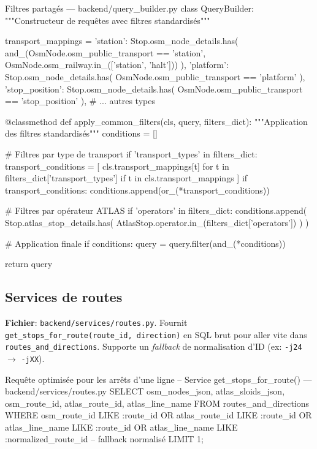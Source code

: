 \begin{codebox}[language=Python]{Filtres partagés — backend/query\_builder.py}
class QueryBuilder:
    """Constructeur de requêtes avec filtres standardisés"""
    
    transport_mappings = {
        'station': Stop.osm_node_details.has(
            and_(OsmNode.osm_public_transport == 'station',
                 OsmNode.osm_railway.in_(['station', 'halt']))
        ),
        'platform': Stop.osm_node_details.has(
            OsmNode.osm_public_transport == 'platform'
        ),
        'stop_position': Stop.osm_node_details.has(
            OsmNode.osm_public_transport == 'stop_position'
        ),
        # ... autres types
    }
    
    @classmethod
    def apply_common_filters(cls, query, filters_dict):
        """Application des filtres standardisés"""
        conditions = []
        
        # Filtres par type de transport
        if 'transport_types' in filters_dict:
            transport_conditions = [
                cls.transport_mappings[t] 
                for t in filters_dict['transport_types']
                if t in cls.transport_mappings
            ]
            if transport_conditions:
                conditions.append(or_(*transport_conditions))
        
        # Filtres par opérateur ATLAS
        if 'operators' in filters_dict:
            conditions.append(
                Stop.atlas_stop_details.has(
                    AtlasStop.operator.in_(filters_dict['operators'])
                )
            )
        
        # Application finale
        if conditions:
            query = query.filter(and_(*conditions))
        
        return query
\end{codebox}

\subsection*{Services de routes}

\textbf{Fichier}: \texttt{backend/services/routes.py}. Fournit \texttt{get\_stops\_for\_route(route\_id, direction)} en SQL brut pour aller vite dans \texttt{routes\_and\_directions}. Supporte un \textit{fallback} de normalisation d'ID (ex: \texttt{-j24} $\rightarrow$ \texttt{-jXX}).

\begin{codebox}[language=SQL]{Requête optimisée pour les arrêts d'une ligne}
-- Service get_stops_for_route() — backend/services/routes.py
SELECT 
    osm_nodes_json, 
    atlas_sloids_json,
    osm_route_id,
    atlas_route_id,
    atlas_line_name
FROM routes_and_directions
WHERE 
    osm_route_id LIKE :route_id 
    OR atlas_route_id LIKE :route_id 
    OR atlas_line_name LIKE :route_id
    OR atlas_line_name LIKE :normalized_route_id  -- fallback normalisé
LIMIT 1;
\end{codebox}

